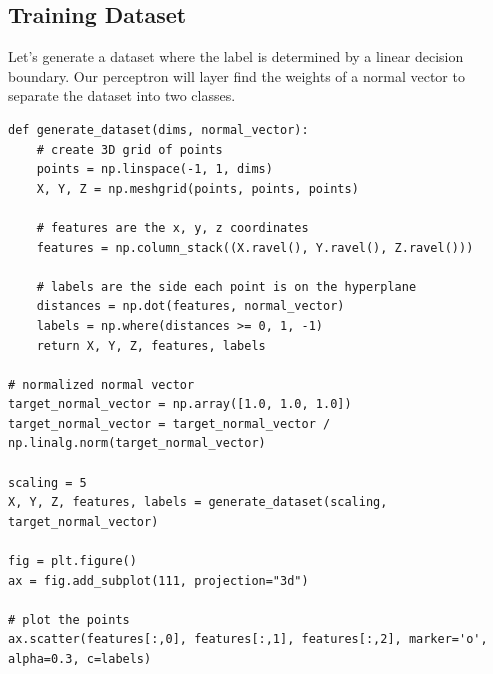 \documentclass[openany]{book}
\begin{document}
    \subsection{Training Dataset}\label{training-dataset}

Let's generate a dataset where the label is determined by a linear
decision boundary. Our perceptron will layer find the weights of a
normal vector to separate the dataset into two classes.

\begin{tcolorbox}
\tiny
\begin{verbatim}
def generate_dataset(dims, normal_vector):
    # create 3D grid of points
    points = np.linspace(-1, 1, dims)
    X, Y, Z = np.meshgrid(points, points, points)

    # features are the x, y, z coordinates
    features = np.column_stack((X.ravel(), Y.ravel(), Z.ravel()))

    # labels are the side each point is on the hyperplane
    distances = np.dot(features, normal_vector)
    labels = np.where(distances >= 0, 1, -1)
    return X, Y, Z, features, labels

# normalized normal vector
target_normal_vector = np.array([1.0, 1.0, 1.0])
target_normal_vector = target_normal_vector / np.linalg.norm(target_normal_vector)

scaling = 5
X, Y, Z, features, labels = generate_dataset(scaling, target_normal_vector)

fig = plt.figure()
ax = fig.add_subplot(111, projection="3d")

# plot the points
ax.scatter(features[:,0], features[:,1], features[:,2], marker='o', alpha=0.3, c=labels)
\end{verbatim}
\end{tcolorbox}
        
\end{document}
